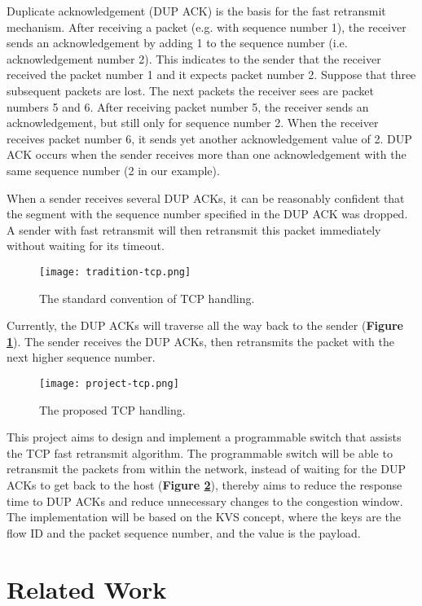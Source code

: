 Duplicate acknowledgement (DUP ACK) is the basis for the fast retransmit mechanism. After receiving a packet (e.g. with sequence number 1), the receiver sends an acknowledgement by adding 1 to the sequence number (i.e. acknowledgement number 2). This indicates to the sender that the receiver received the packet number 1 and it expects packet number 2. Suppose that three subsequent packets are lost. The next packets the receiver sees are packet numbers 5 and 6. After receiving packet number 5, the receiver sends an acknowledgement, but still only for sequence number 2. When the receiver receives packet number 6, it sends yet another acknowledgement value of 2. DUP ACK occurs when the sender receives more than one acknowledgement with the same sequence number (2 in our example).

When a sender receives several DUP ACKs, it can be reasonably confident that the segment with the sequence number specified in the DUP ACK was dropped. A sender with fast retransmit will then retransmit this packet immediately without waiting for its timeout.

\begin{figure}[h]
	\centering
	\texttt{[image: tradition-tcp.png]}
	\caption{The standard convention of TCP handling.}
	\label{tradition-tcp}
\end{figure}

Currently, the DUP ACKs will traverse all the way back to the sender (\textbf{Figure \ref{tradition-tcp}}). The sender receives the DUP ACKs, then retransmits the packet with the next higher sequence number. 

\begin{figure}[h]
	\centering
	\texttt{[image: project-tcp.png]}
	\caption{The proposed TCP handling.}
	\label{project-tcp}
\end{figure}

This project aims to design and implement a programmable switch that assists the TCP fast retransmit algorithm. The programmable switch will be able to retransmit the packets from within the network, instead of waiting for the DUP ACKs to get back to the host (\textbf{Figure \ref{project-tcp}}), thereby aims to reduce the response time to DUP ACKs and reduce unnecessary changes to the congestion window. The implementation will be based on the KVS concept, where the keys are the flow ID and the packet sequence number, and the value is the payload.

\section{Related Work}
